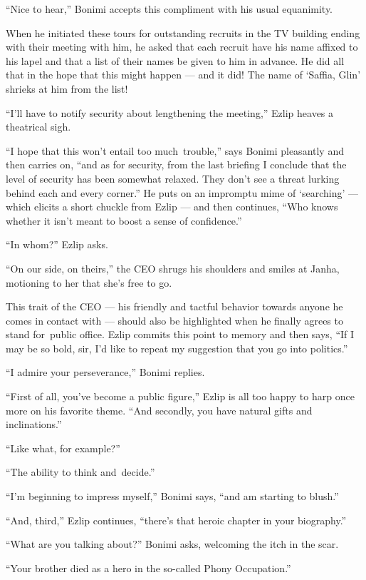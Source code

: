 \documentclass[twoside,11pt]{book}
\begin{document}
``Nice to hear,'' Bonimi accepts this compliment with his usual equanimity.

When he initiated these tours for outstanding recruits in the TV building ending with their meeting with him, he
asked that each recruit have his name affixed to his lapel and that a list of their names be given to him in advance.
He did all that in the hope that this might  happen --- and{ }it did! The name
of `Saffia, Glin' shrieks at him from the list!

``I'll have to notify security about lengthening the meeting,'' Ezlip heaves a theatrical
sigh.

``I hope that this won't entail too much~trouble,'' says Bonimi pleasantly and then carries
on, ``and as for security, from the last briefing I conclude that the level of security has been
somewhat relaxed. They don't see a threat lurking behind each and every corner.'' He puts on an impromptu
mime of `searching' --- which elicits a short chuckle from Ezlip --- and then continues, ``Who knows
whether it isn't meant to boost a sense of confidence.''

``In whom?'' Ezlip asks.

``On our side, on theirs,'' the CEO shrugs his shoulders and smiles
at Janha, motioning to her that she's free to go.

This trait of the CEO --- his friendly and tactful behavior towards anyone he comes in contact with --- should also be
highlighted when he finally agrees to stand for~public office.  Ezlip commits this point to memory and then says,
``If I may be so bold, sir, I'd like to repeat my suggestion that you go into politics.''

``I admire your perseverance,'' Bonimi replies.

``First of all, you've become a public figure,'' Ezlip is all too happy to harp once more
on his favorite theme. ``And secondly, you have natural gifts and inclinations.''

``Like what, for example?''

``The ability to think and~decide.''

``I'm beginning to impress myself,'' Bonimi says, ``and am starting to
blush.''

``And, third,'' Ezlip continues, ``there's that heroic chapter in your
biography.''

``What are you talking about?'' Bonimi asks, welcoming the itch in the scar.

``Your brother died as a hero in the so-called Phony Occupation.''
\end{document}

